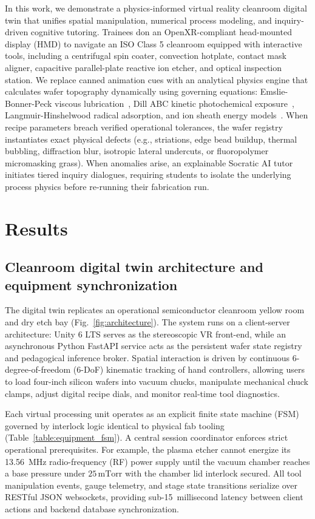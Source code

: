 \documentclass[10pt,a4paper,twocolumn]{article}
\begin{document}
In this work, we demonstrate a physics-informed virtual reality cleanroom digital twin that unifies spatial manipulation, numerical process modeling, and inquiry-driven cognitive tutoring. Trainees don an OpenXR-compliant head-mounted display (HMD) to navigate an ISO Class 5 cleanroom equipped with interactive tools, including a centrifugal spin coater, convection hotplate, contact mask aligner, capacitive parallel-plate reactive ion etcher, and optical inspection station. We replace canned animation cues with an analytical physics engine that calculates wafer topography dynamically using governing equations: Emslie-Bonner-Peck viscous lubrication~\cite{emslie1958flow}, Dill ABC kinetic photochemical exposure~\cite{dill1975optical}, Langmuir-Hinshelwood radical adsorption, and ion sheath energy models~\cite{lieberman2005principles}. When recipe parameters breach verified operational tolerances, the wafer registry instantiates exact physical defects (e.g., striations, edge bead buildup, thermal bubbling, diffraction blur, isotropic lateral undercuts, or fluoropolymer micromasking grass). When anomalies arise, an explainable Socratic AI tutor initiates tiered inquiry dialogues, requiring students to isolate the underlying process physics before re-running their fabrication run.

\section*{Results}

\subsection*{Cleanroom digital twin architecture and equipment synchronization}
The digital twin replicates an operational semiconductor cleanroom yellow room and dry etch bay (Fig.~\ref{fig:architecture}). The system runs on a client-server architecture: Unity 6 LTS serves as the stereoscopic VR front-end, while an asynchronous Python FastAPI service acts as the persistent wafer state registry and pedagogical inference broker. Spatial interaction is driven by continuous 6-degree-of-freedom (6-DoF) kinematic tracking of hand controllers, allowing users to load four-inch silicon wafers into vacuum chucks, manipulate mechanical chuck clamps, adjust digital recipe dials, and monitor real-time tool diagnostics.

Each virtual processing unit operates as an explicit finite state machine (FSM) governed by interlock logic identical to physical fab tooling (Table~\ref{table:equipment_fsm}). A central session coordinator enforces strict operational prerequisites. For example, the plasma etcher cannot energize its 13.56~MHz radio-frequency (RF) power supply until the vacuum chamber reaches a base pressure under $25\,\text{mTorr}$ with the chamber lid interlock secured. All tool manipulation events, gauge telemetry, and stage state transitions serialize over RESTful JSON websockets, providing sub-15~millisecond latency between client actions and backend database synchronization.
\end{document}
